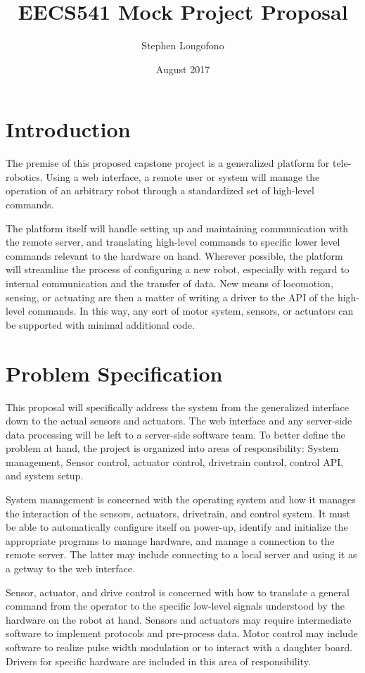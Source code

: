 \documentclass[10pt]{article}
\title{EECS541 Mock Project Proposal}
\author{Stephen Longofono}
\date{August 2017}
\begin{document}
\maketitle

\section{Introduction}

The premise of this proposed capstone project is a generalized platform for tele-robotics.  Using a web interface, a remote user or system will manage the operation of an arbitrary robot through a standardized set of high-level commands.

The platform itself will handle setting up and maintaining communication with the remote server, and translating high-level commands to specific lower level commands relevant to the hardware on hand.  Wherever possible, the platform will streamline the process of configuring a new robot, especially with regard to internal communication and the transfer of data.  New means of locomotion, sensing, or actuating are then a matter of writing a driver to the API of the high-level commands.  In this way, any sort of motor system, sensors, or actuators can be supported with minimal additional code.

\section{Problem Specification}
This proposal will specifically address the system from the generalized interface down to the actual sensors and actuators.  The web interface and any server-side data processing will be left to a server-side software team.  To better define the problem at hand, the project is organized into areas of responsibility: System management, Sensor control, actuator control, drivetrain control, control API, and system setup.

System management is concerned with the operating system and how it manages the interaction of the sensors, actuators, drivetrain, and control system.  It must be able to automatically configure itself on power-up, identify and initialize the appropriate programs to manage hardware, and manage a connection to the remote server.  The latter may include connecting to a local server and using it as a getway to the web interface.

Sensor, actuator, and drive control is concerned with how to translate a general command from the operator to the specific low-level signals understood by the hardware on the robot at hand.  Sensors and actuators may require intermediate software to implement protocols and pre-process data.  Motor control may include software to realize pulse width modulation or to interact with a daughter board.  Drivers for specific hardware are included in this area of responsibility.
\end{document}
